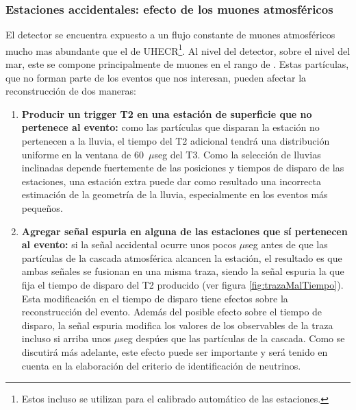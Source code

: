 		\subsubsection{Estaciones accidentales: efecto de los muones atmosféricos}
		
		El detector se encuentra expuesto a un flujo constante de muones atmosféricos mucho mas abundante que el de UHECR\footnote{Estos incluso se utilizan para el calibrado automático de las estaciones.}. 
		Al nivel del detector,  sobre el nivel del mar, este se compone principalmente de muones en el rango de . 
		Estas partículas, que no forman parte de los eventos que nos interesan, pueden afectar la reconstrucción de dos maneras:
		\begin{enumerate}
		\item \textbf{Producir un trigger T2 en una estación de superficie que no pertenece al evento:} como las partículas que disparan la estación no pertenecen a la lluvia, el tiempo del T2 adicional tendrá una distribución uniforme en la ventana de 60~$\mu$seg del T3. Como la selección de lluvias inclinadas depende fuertemente de las posiciones y tiempos de disparo de las estaciones, una estación extra puede dar como resultado una incorrecta estimación de la geometría de la lluvia, especialmente en los eventos más pequeños.

		\item \textbf{Agregar señal espuria en alguna de las estaciones que sí pertenecen al evento:} si la señal accidental ocurre unos pocos $\mu$seg antes de que las partículas de la cascada atmosférica alcancen la estación, el resultado es que ambas señales se fusionan en una misma traza, siendo la señal espuria la que fija el tiempo de disparo del T2 producido (ver figura \ref{fig:trazaMalTiempo}). Esta modificación en el tiempo de disparo tiene efectos sobre la reconstrucción del evento. 
		Además del posible efecto sobre el tiempo de disparo, la señal espuria modifica los valores de los observables de la traza incluso si arriba unos $\mu$seg despúes que las partículas de la cascada. Como se discutirá más adelante, este efecto puede ser importante y será tenido en cuenta en la elaboración del criterio de identificación de neutrinos. 
		\end{enumerate}
